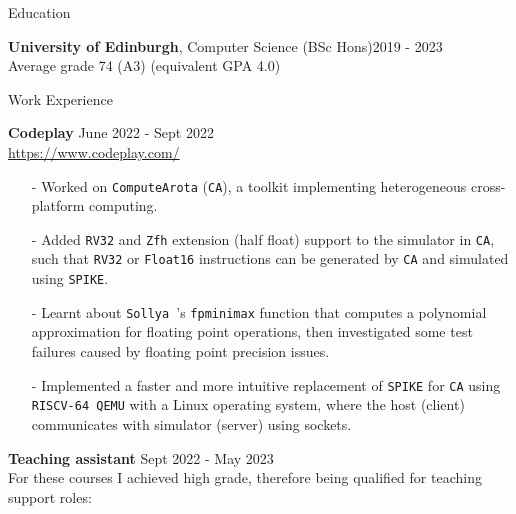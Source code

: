 \documentclass{resume} %
\newcommand{\itemsepval}{-6pt}
\newcommand{\code}{\texttt}
\begin{document}
\begin{rSection}{Education}

{\bf  University of Edinburgh}, Computer Science (BSc Hons)\hfill {2019 - 2023} \\
Average grade 74 (A3) (equivalent GPA 4.0)

\end{rSection}

\begin{rSection}{Work Experience}


     
    \textbf{Codeplay} \hfill June 2022 - Sept 2022 \\
    \url{https://www.codeplay.com/} \hfill \par
    \begin{itemize}
        \itemsep \itemsepval {} 
        \item[-] Worked on \code{ComputeArota} (\code{CA}), a toolkit implementing heterogeneous cross-platform computing.
        \item[-] Added \code{RV32} and \code{Zfh} extension (half float) support to the simulator in \code{CA}, such that \code{RV32} or \code{Float16} instructions can be generated by \code{CA} and simulated using \code{SPIKE}.
        \item[-] Learnt about \code{Sollya }’s \code{fpminimax} function that computes a polynomial approximation for floating point operations, then investigated some test failures caused by floating point precision issues.
        \item[-] Implemented a faster and more intuitive replacement of \code{SPIKE} for \code{CA} using \code{RISCV-64 QEMU} with a Linux operating system, where the host (client) communicates with simulator (server) using sockets. 
    \end{itemize}
    
    \textbf{Teaching assistant} \hfill Sept 2022 - May 2023     \\
    For these courses I achieved high grade, therefore being qualified for teaching support roles:
    

\end{rSection}
\end{document}
